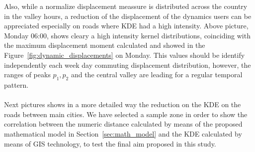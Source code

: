 Also, while a normalize displacement meassure is distributed across the country in the valley hours, a reduction of the displacement of the dynamics users can be appreciated especially on roads where KDE had a high intensity. Above picture,  Monday 06:00, shows cleary a high intensity kernel distributions, coinciding with the maximum displacement moment calculated and showed in the Figure~\ref{fig:dynamic_displacements} on Monday. This values should be identify independently each week day commuting displacement distribution, however, the ranges of peaks $p_1, p_2$ and the central valley are leading for a regular temporal pattern. 
\\
\\
Next pictures shows in a more detailed way the reduction on the KDE on the roads between main cities. We have selected a sample zone in order to show the correlation between the numeric distance calculated by means of the proposed mathematical model in Section~\ref{sec:math_model} and the KDE calculated by means of GIS technology, to test the final aim proposed in this study.
\newpage

